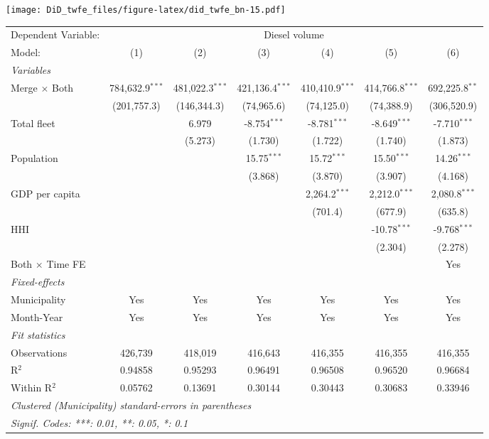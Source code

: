 \documentclass[
]{article}
\begin{document}
\texttt{[image: DiD\_twfe\_files/figure-latex/did\_twfe\_bn-15.pdf]}

\begin{tabular}{lcccccc}
\tabularnewline\midrule\midrule
Dependent Variable:&\multicolumn{6}{c}{Diesel volume}\\
Model:&(1) & (2) & (3) & (4) & (5) & (6)\\
\midrule \emph{Variables}&   &   &   &   &   &  \\
Merge $\times $ Both & 784,632.9$^{***}$ & 481,022.3$^{***}$ & 421,136.4$^{***}$ & 410,410.9$^{***}$ & 414,766.8$^{***}$ & 692,225.8$^{**}$\\
  &(201,757.3) & (146,344.3) & (74,965.6) & (74,125.0) & (74,388.9) & (306,520.9)\\
Total fleet &    & 6.979 & -8.754$^{***}$ & -8.781$^{***}$ & -8.649$^{***}$ & -7.710$^{***}$\\
  &   & (5.273) & (1.730) & (1.722) & (1.740) & (1.873)\\
Population &    &    & 15.75$^{***}$ & 15.72$^{***}$ & 15.50$^{***}$ & 14.26$^{***}$\\
  &   &    & (3.868) & (3.870) & (3.907) & (4.168)\\
GDP per capita &    &    &    & 2,264.2$^{***}$ & 2,212.0$^{***}$ & 2,080.8$^{***}$\\
  &   &    &    & (701.4) & (677.9) & (635.8)\\
HHI &    &    &    &    & -10.78$^{***}$ & -9.768$^{***}$\\
  &   &    &    &    & (2.304) & (2.278)\\
Both $\times$ Time FE &  &  &  &  &  & Yes\\
\midrule \emph{Fixed-effects}&   &   &   &   &   &  \\
Municipality & Yes & Yes & Yes & Yes & Yes & Yes\\
Month-Year & Yes & Yes & Yes & Yes & Yes & Yes\\
\midrule \emph{Fit statistics}&  & & & & & \\
Observations & 426,739&418,019&416,643&416,355&416,355&416,355\\
R$^2$ & 0.94858&0.95293&0.96491&0.96508&0.96520&0.96684\\
Within R$^2$ & 0.05762&0.13691&0.30144&0.30443&0.30683&0.33946\\
\midrule\midrule\multicolumn{7}{l}{\emph{Clustered (Municipality) standard-errors in parentheses}}\\
\multicolumn{7}{l}{\emph{Signif. Codes: ***: 0.01, **: 0.05, *: 0.1}}\\
\end{tabular}
\end{document}
